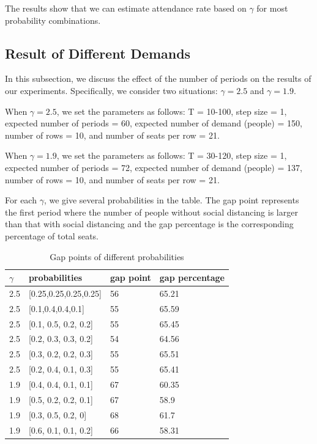 The results show that we can estimate attendance rate based on $\gamma$ for most probability combinations. 

\subsection{Result of Different Demands}
In this subsection, we discuss the effect of the number of periods on the results of our experiments. Specifically, we consider two situations: $\gamma = 2.5$ and $\gamma = 1.9$.

When $\gamma = 2.5$, we set the parameters as follows: T = 10-100, step size = 1, expected number of periods = 60, expected number of demand (people) = 150, number of rows = 10, and number of seats per row = 21.

When $\gamma = 1.9$, we set the parameters as follows: T = 30-120, step size = 1, expected number of periods = 72, expected number of demand (people) = 137, number of rows = 10, and number of seats per row = 21.

For each $\gamma$, we give several probabilities in the table. The gap point represents the first period where the number of people without social distancing is larger than that with social distancing and the gap percentage is the corresponding percentage of total seats.



\begin{table}[ht]
  \centering
  \caption{Gap points of different probabilities}
  \begin{tabular}{|l|l|l|l|}
  \hline
  $\gamma$  & probabilities & gap point & gap percentage \\
  \hline
  2.5  & [0.25,0.25,0.25,0.25] & 56 & 65.21 \\
  2.5  & [0.1,0.4,0.4,0.1] & 55 & 65.59 \\
  2.5  & [0.1, 0.5, 0.2, 0.2] & 55 & 65.45 \\
  2.5  & [0.2, 0.3, 0.3, 0.2] & 54 & 64.56 \\
  2.5  & [0.3, 0.2, 0.2, 0.3] & 55 & 65.51\\
  2.5  & [0.2, 0.4, 0.1, 0.3] & 55 & 65.41 \\
  1.9  & [0.4, 0.4, 0.1, 0.1] & 67 & 60.35 \\
  1.9  & [0.5, 0.2, 0.2, 0.1] & 67 & 58.9  \\
  1.9  & [0.3, 0.5, 0.2, 0]  &  68 & 61.7  \\
  1.9  & [0.6, 0.1, 0.1, 0.2] & 66 & 58.31 \\
  \hline
  \end{tabular}
\end{table}


